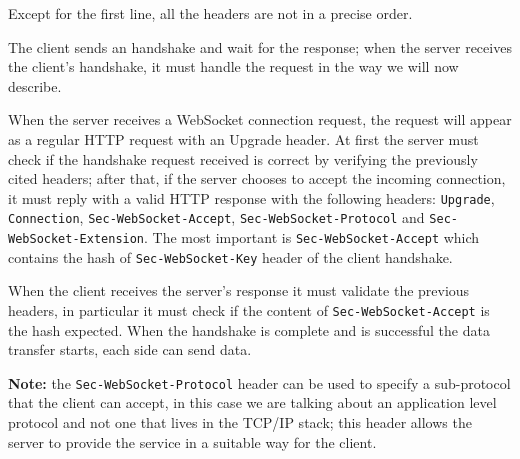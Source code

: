 Except for the first line, all the headers are not in a precise order.\newline

The client sends an handshake and wait for the response; when the server receives the client’s handshake, it must handle the request in the way we will now describe.\newline

When the server receives a WebSocket connection request, the request will appear as a regular HTTP request with an Upgrade header.\newline
At first the server must check if the handshake request received is correct by verifying the previously cited headers;
after that, if the server chooses to accept the incoming connection, it must reply with a valid HTTP response with the following headers: \texttt{Upgrade}, \texttt{Connection}, \texttt{Sec-WebSocket-Accept}, \texttt{Sec-WebSocket-Protocol} and  \texttt{Sec-WebSocket-Extension}.\newline
The most important is \texttt{Sec-WebSocket-Accept} which contains the hash of \texttt{Sec-WebSocket-Key} header of the client handshake.


When the client receives the server’s response it must validate the previous headers, in particular it must check if the 
content of \texttt{Sec-WebSocket-Accept} is the hash expected.\newline
When the handshake is complete and is successful the data transfer starts, each side can send data.\newline

\textbf{Note:} the \texttt{Sec-WebSocket-Protocol} header can be used to specify a sub-protocol that the client can accept, in this case we are talking about an application level protocol and not one that lives in the TCP/IP stack; this header allows the server to provide the service in a suitable way for the client.


